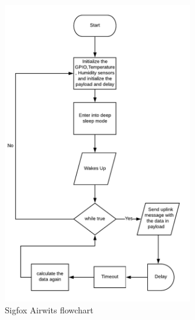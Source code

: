 \documentclass[12pt]{article}
\begin{document}
\begin{figure}[H]
    \centering
    \includegraphics[width=0.9\columnwidth,height=13cm,keepaspectratio]{Images/AirwitsFlowchart.pdf}
    \caption{Sigfox Airwits flowchart}
    \label{fig:Sigfox Airwits flowchart}
\end{figure}
\end{document}
